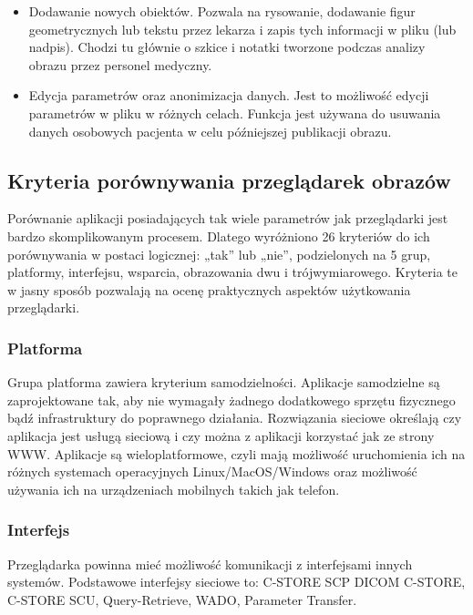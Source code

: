 \begin{itemize}
    \item Dodawanie nowych obiektów.
          Pozwala na rysowanie, dodawanie figur geometrycznych lub tekstu przez lekarza i zapis tych informacji w pliku \DICOM (lub nadpis).
          Chodzi tu głównie o szkice i notatki tworzone podczas analizy obrazu przez personel medyczny.

    \item Edycja parametrów oraz anonimizacja danych.
          Jest to możliwość edycji parametrów w pliku \DICOM w różnych celach.
          Funkcja jest używana do usuwania danych osobowych pacjenta w celu późniejszej publikacji obrazu.

\end{itemize}

\subsection{Kryteria porównywania przeglądarek obrazów}

Porównanie aplikacji posiadających tak wiele parametrów jak przeglądarki \DICOM jest bardzo skomplikowanym procesem.
Dlatego wyróżniono 26 kryteriów do ich porównywania w postaci logicznej: „tak” lub „nie”, podzielonych na 5 grup, platformy, interfejsu, wsparcia, obrazowania dwu i trójwymiarowego.
Kryteria te w jasny sposób pozwalają na ocenę praktycznych aspektów użytkowania przeglądarki.

\subsubsection{Platforma}

Grupa platforma zawiera kryterium samodzielności.
Aplikacje samodzielne są zaprojektowane tak, aby nie wymagały żadnego dodatkowego sprzętu fizycznego bądź infrastruktury do poprawnego działania.
Rozwiązania sieciowe określają czy aplikacja jest usługą sieciową i czy można z aplikacji korzystać jak ze strony WWW.
Aplikacje są wieloplatformowe, czyli mają możliwość uruchomienia ich na różnych systemach operacyjnych Linux/MacOS/Windows oraz możliwość używania ich na urządzeniach mobilnych takich jak telefon.

\subsubsection{Interfejs}

Przeglądarka powinna mieć możliwość komunikacji z interfejsami innych systemów.
Podstawowe interfejsy sieciowe to: C-STORE SCP DICOM C-STORE, C-STORE SCU, Query-Retrieve, WADO, Parameter Transfer.


